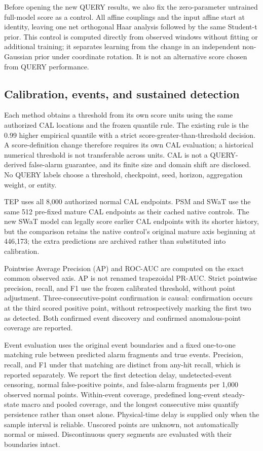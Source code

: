 \documentclass[
  english,
]{article}
\begin{document}
Before opening the new QUERY results, we also fix the zero-parameter
untrained full-model score as a control. All affine couplings and the
input affine start at identity, leaving one net orthogonal Haar analysis
followed by the same Student-t prior. This control is computed directly
from observed windows without fitting or additional training; it
separates learning from the change in an independent non-Gaussian prior
under coordinate rotation. It is not an alternative score chosen from
QUERY performance.

\subsection{Calibration, events, and sustained
detection}\label{calibration-events-and-sustained-detection}

Each method obtains a threshold from its own score units using the same
authorized CAL locations and the frozen quantile rule. The existing rule
is the 0.99 higher empirical quantile with a strict
score-greater-than-threshold decision. A score-definition change
therefore requires its own CAL evaluation; a historical numerical
threshold is not transferable across units. CAL is not a QUERY-derived
false-alarm guarantee, and its finite size and domain shift are
disclosed. No QUERY labels choose a threshold, checkpoint, seed,
horizon, aggregation weight, or entity.

TEP uses all 8,000 authorized normal CAL endpoints. PSM and SWaT use the
same 512 pre-fixed mature CAL endpoints as their cached native controls.
The new SWaT model can legally score earlier CAL endpoints with its
shorter history, but the comparison retains the native control's
original mature axis beginning at 446,173; the extra predictions are
archived rather than substituted into calibration.

Pointwise Average Precision (AP) and ROC-AUC are computed on the exact
common observed axis. AP is not renamed trapezoidal PR-AUC. Strict
pointwise precision, recall, and F1 use the frozen calibrated threshold,
without point adjustment. Three-consecutive-point confirmation is
causal: confirmation occurs at the third scored positive point, without
retrospectively marking the first two as detected. Both confirmed event
discovery and confirmed anomalous-point coverage are reported.

Event evaluation uses the original event boundaries and a fixed
one-to-one matching rule between predicted alarm fragments and true
events. Precision, recall, and F1 under that matching are distinct from
any-hit recall, which is reported separately. We report the first
detection delay, undetected-event censoring, normal false-positive
points, and false-alarm fragments per 1,000 observed normal points.
Within-event coverage, predefined long-event steady-state macro and
pooled coverage, and the longest consecutive miss quantify persistence
rather than onset alone. Physical-time delay is supplied only when the
sample interval is reliable. Unscored points are unknown, not
automatically normal or missed. Discontinuous query segments are
evaluated with their boundaries intact.
\end{document}
